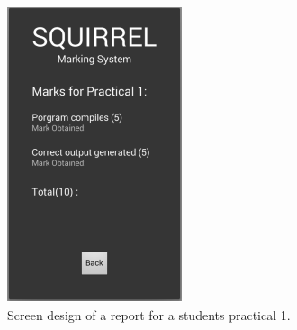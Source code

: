\documentclass[11pt,a4paper]{article}
\begin{document}
\pagebreak
	\begin{figure}[h]
	\centering
	\includegraphics[width=0.7\linewidth]{./mobile_pracMarksheet}
	\caption{Screen design of a report for a students practical 1.}
	\label{fig:mobile_pracMarksheet}
	\end{figure}
\pagebreak		
\end{document}
